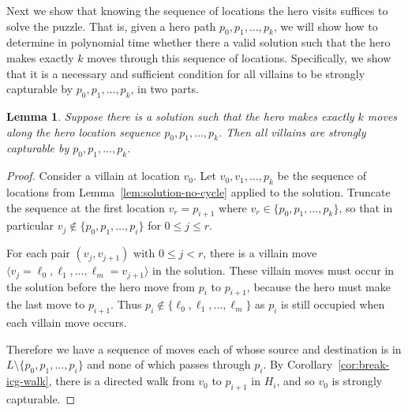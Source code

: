 \documentclass[11pt,letterpaper]{article}
\theoremstyle{plain}
\newtheorem{lemma}[theorem]{Lemma}
\theoremstyle{definition}
\theoremstyle{remark}
\numberwithin{equation}{section}
\begin{document}
Next we show that knowing the sequence of locations the hero visits
suffices to solve the puzzle.
That is, given a hero path $p_0, p_1, \ldots, p_k$,
we will show how to determine in polynomial time
whether there a valid solution such that the hero makes exactly $k$ moves
through this sequence of locations.
Specifically, we show that it is a necessary and sufficient condition for
all villains to be strongly capturable by $p_0, p_1, \ldots, p_k$,
in two parts.

\begin{lemma}
  \label{lem:soln-strongly-capturable}
  Suppose there is a solution such that the hero makes exactly $k$ moves
  along the hero location sequence $p_0, p_1, \ldots, p_k$.
  Then all villains are strongly capturable by $p_0, p_1, \ldots, p_k$.
\end{lemma}
\begin{proof}
  Consider a villain at location \(v_0\).
  Let \(v_0, v_1, \dots, p_k\) be the sequence of locations from
  Lemma~\ref{lem:solution-no-cycle} applied to the solution.
  Truncate the sequence at the first location \(v_r = p_{i+1}\)
  where \(v_r \in \{p_0, p_1, \ldots, p_k\}\),
  so that in particular \(v_j \notin \{p_0, p_1, \ldots, p_i\}\)
  for \(0 \leq j \le r\).

  For each pair \((v_j, v_{j+1})\) with \(0 \le j < r\), there is a villain move $\langle v_j = \ell_0, \ell_1, \ldots, \ell_m = v_{j+1} \rangle$ in the solution.
  These villain moves must occur in the solution before the hero move from \(p_i\) to \(p_{i+1}\), because the hero must make the last move to \(p_{i+1}\).
  Thus \(p_i \notin \{\ell_0, \ell_1, \ldots, \ell_m\}\)
  as \(p_i\) is still occupied when each villain move occurs.

  Therefore we have a sequence of moves
  each of whose source and destination is in \(L \setminus \{p_0, p_1, \ldots, p_i\}\)
  and none of which passes through \(p_i\).
  By Corollary~\ref{cor:break-icg-walk},
  there is a directed walk from \(v_0\) to \(p_{i+1}\) in \(H_i\),
  and so \(v_0\) is strongly capturable.
\end{proof}
\end{document}
